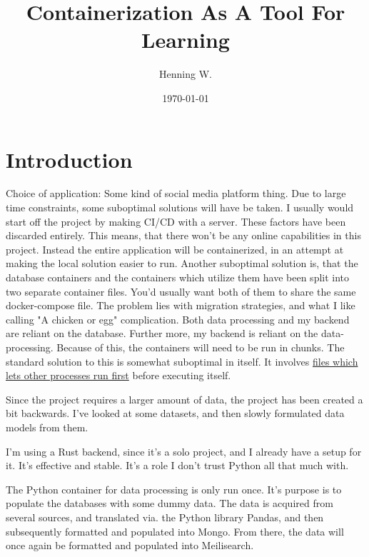 \documentclass[a4paper, 12pt]{article}
\begin{document}
\title{\Large{\textbf{Containerization As A Tool For Learning}}}
\author{Henning W.}
\date{\today}
\maketitle
\fancyhf{}
\renewcommand{\headrulewidth}{2pt}
\renewcommand{\headrulewidth}{2pt}
\fancyhead{\leftmark}
\fancyfoot{\thepage}

\section{Introduction}
Choice of application: Some kind of social media platform thing. Due to large time constraints, some suboptimal solutions will have be taken. I usually would start off the project by making CI/CD with a server. These factors have been discarded entirely. This means, that there won't be any online capabilities in this project. Instead the entire application will be containerized, in an attempt at making the local solution easier to run. Another suboptimal solution is, that the database containers and the containers which utilize them have been split into two separate container files. You'd usually want both of them to share the same docker-compose file. The problem lies with migration strategies, and what I like calling "A chicken or egg" complication. Both data processing and my backend are reliant on the database. Further more, my backend is reliant on the data-processing. Because of this, the containers will need to be run in chunks. The standard solution to this is somewhat suboptimal in itself. It involves \href{https://github.com/vishnubob/wait-for-it}{files which lets other processes run first} before executing itself.

Since the project requires a larger amount of data, the project has been created a bit backwards. I've looked at some datasets, and then slowly formulated data models from them.

I'm using a Rust backend, since it's a solo project, and I already have a setup for it. It's effective and stable. It's a role I don't trust Python all that much with.

The Python container for data processing is only run once. It's purpose is to populate the databases with some dummy data. The data is acquired from several sources, and translated via. the Python library Pandas, and then subsequently formatted and populated into Mongo. From there, the data will once again be formatted and populated into Meilisearch.
\end{document}

